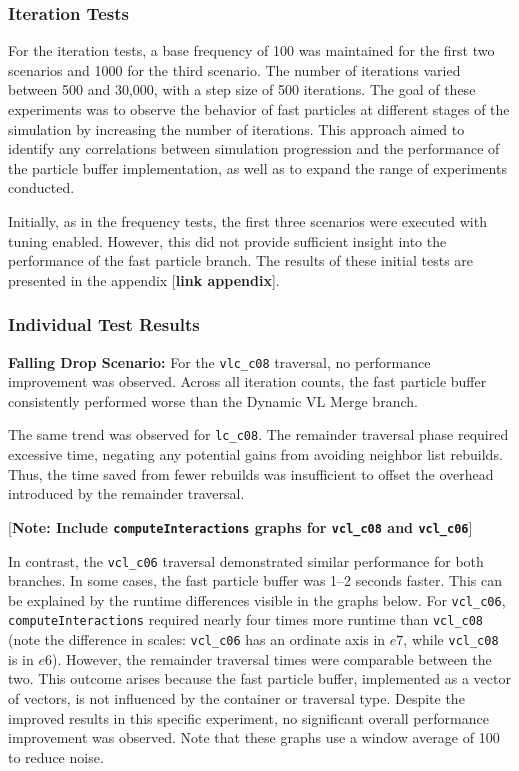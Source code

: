 \subsubsection{Iteration Tests}


For the iteration tests, a base frequency of 100 was maintained for the first two scenarios and 1000 for the third scenario. The number of iterations varied between 500 and 30,000, with a step size of 500 iterations. The goal of these experiments was to observe the behavior of fast particles at different stages of the simulation by increasing the number of iterations. This approach aimed to identify any correlations between simulation progression and the performance of the particle buffer implementation, as well as to expand the range of experiments conducted.

Initially, as in the frequency tests, the first three scenarios were executed with tuning enabled. However, this did not provide sufficient insight into the performance of the fast particle branch. The results of these initial tests are presented in the appendix [\textbf{link appendix}].

\subsubsection{Individual Test Results}

\textbf{Falling Drop Scenario:}
For the \texttt{vlc\_c08} traversal, no performance improvement was observed. Across all iteration counts, the fast particle buffer consistently performed worse than the Dynamic VL Merge branch. 

The same trend was observed for \texttt{lc\_c08}. The remainder traversal phase required excessive time, negating any potential gains from avoiding neighbor list rebuilds. Thus, the time saved from fewer rebuilds was insufficient to offset the overhead introduced by the remainder traversal.

[\textbf{Note: Include \texttt{computeInteractions} graphs for \texttt{vcl\_c08} and \texttt{vcl\_c06}}]

In contrast, the \texttt{vcl\_c06} traversal demonstrated similar performance for both branches. In some cases, the fast particle buffer was 1--2 seconds faster. This can be explained by the runtime differences visible in the graphs below.  For \texttt{vcl\_c06}, \texttt{computeInteractions} required nearly four times more runtime than \texttt{vcl\_c08} (note the difference in scales: \texttt{vcl\_c06} has an ordinate axis in $e7$, while \texttt{vcl\_c08} is in $e6$). However, the remainder traversal times were comparable between the two. This outcome arises because the fast particle buffer, implemented as a vector of vectors, is not influenced by the container or traversal type. Despite the improved results in this specific experiment, no significant overall performance improvement was observed. Note that these graphs use a window average of 100 to reduce noise.

